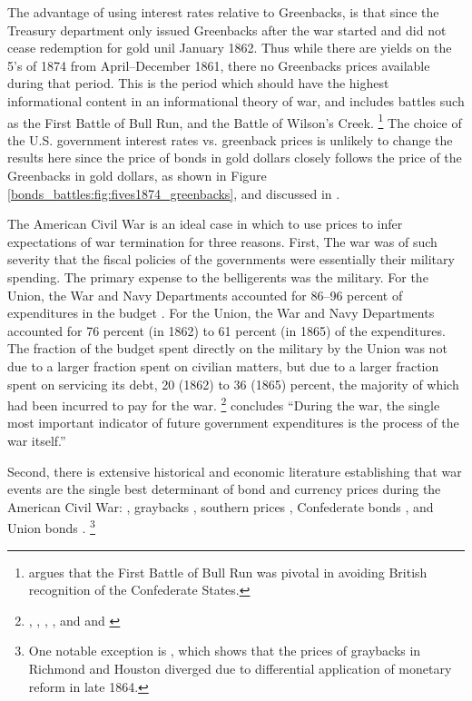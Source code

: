The advantage of using interest rates relative to Greenbacks, is that since the Treasury department only issued Greenbacks after the war started and did not cease redemption for gold unil January 1862.
Thus while there are yields on the 5's of 1874 from April--December 1861, there no Greenbacks prices available during that period.
This is the period which should have the highest informational content in an informational theory of war, and includes battles such as the First Battle of Bull Run, and the Battle of Wilson's Creek.%
\footnote{\textcite{Poast2012} argues that the First Battle of Bull Run was pivotal in avoiding British recognition of the Confederate States.}
The choice of the U.S. government interest rates vs. greenback prices is unlikely to change the results here since the price of bonds in gold dollars closely follows the price of the Greenbacks in gold dollars, as shown in Figure \ref{bonds_battles:fig:fives1874_greenbacks}, and discussed in \textcite{Roll1972}.

The American Civil War is an ideal case in which to use prices to
infer expectations of war termination for three reasons. %
First, The war was of such severity that the fiscal policies of the
governments were essentially their military spending. %
The primary expense to the belligerents was the military. %
For the Union, the War and Navy Departments accounted for 86--96
percent of expenditures in the budget \parencites[][259]{Ball1991}[see
also][354-355]{BurdekinLangdana1993}. %
For the Union, the War and Navy Departments accounted for 76 percent
(in 1862) to 61 percent (in 1865) of the expenditures. %
The fraction of the budget spent directly on the military by the Union
was not due to a larger fraction spent on civilian matters, but due to
a larger fraction spent on servicing its debt, 20 (1862) to 36 (1865)
percent, the majority of which had been incurred to pay for the war.%
\footnote{%
  \textcite{Treasury1861a}, \textcite{Treasury1861b},
  \textcite{Treasury1862}, \textcite{Treasury1863}, and
  \textcite{Treasury1864} and \textcite{Treasury1865} %
} %
\parencite[][668]{McCandless1996} concludes ``During the war, the
single most important indicator of future government expenditures is
the process of the war itself.''%

Second, there is extensive historical and economic literature establishing that war events are the single best determinant of bond and currency prices during the American Civil War:
\parencites{Mitchell1903}{Mitchell1908}{Calomiris1988}{WillardGuinnaneEtAl1996}{McCandless1996}{SmithSmith1997},
graybacks \parencites{Schwab1901}{Weidenmier2002}, southern prices
\parencite{BurdekinLangdana1993}, Confederate bonds
\parencites{DavisPecquet1990}{BrownBurdekin2000}{OosterlinckWeidenmier2007},
and Union bonds \parencite{Roll1972}.%
\footnote{One notable exception is \textcite{BurdekinWeidenmier2001},
  which shows that the prices of graybacks in Richmond and Houston
  diverged due to differential application of monetary reform in late
  1864.}

